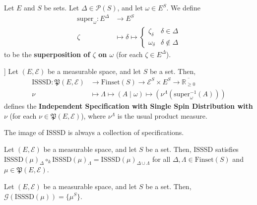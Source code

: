
\begin{definition}[Superposition]
    \label{def:superposition}
    \leanok
    Let $E$ and $S$ be sets. Let $\Delta\in\mathcal{P}(S)$, and let $\omega\in E^S$. We define
    \begin{align*}
        \text{super}_\omega:E^\Delta&\to E^S\\
        \zeta&\mapsto \delta\mapsto\begin{cases}
            \zeta_\delta & \delta\in\Delta\\
            \omega_\delta & \delta\notin\Delta
        \end{cases}
    \end{align*}
    to be the \textbf{superposition of $\zeta$ on $\omega$} (for each $\zeta\in E^\Delta$).
\end{definition}

\begin{definition}[Independent Specification with Single Spin Distribution [ISSSD]]
    \label{def:ISSSD}
    Let $(E,\mathcal{E})$ be a measurable space, and let $S$ be a set. Then,
    \begin{align*}
        \text{ISSSD}:\mathfrak{P}(E,\mathcal{E})&\to\text{Finset}(S)\to\mathcal{E}^S\times E^S\to\overline{\mathbb{R}_{\geq0}}\\
        \nu&\mapsto\Lambda\mapsto(A\mid\omega)\mapsto\left(\nu^\Lambda\left(\text{super}_\omega^{-1}(A)\right)\right)
    \end{align*}
    defines the \textbf{Independent Specification with Single Spin Distribution with $\nu$} (for each $\nu\in\mathfrak{P}(E,\mathcal{E})$), where $\nu^\Lambda$ is the usual product measure.
\end{definition}

\begin{lemma}
    \label{lem:isssd-specification}
    The image of $\text{ISSSD}$ is always a collection of specifications.
\end{lemma}

\begin{lemma}
    \label{lem:isssd-strong-consistency}
    Let $(E,\mathcal{E})$ be a measurable space, and let $S$ be a set. Then, $\text{ISSSD}$ satisfies $\text{ISSSD}(\mu)_\Delta\circ_k\text{ISSSD}(\mu)_\Lambda=\text{ISSSD}(\mu)_{\Delta\cup\Lambda}$ for all $\Delta,\Lambda\in\text{Finset}(S)$ and $\mu\in\mathfrak{P}(E,\mathcal{E})$.
\end{lemma}

\begin{lemma}
    \label{lem:gibbs-measure-existence}
    Let $(E,\mathcal{E})$ be a measurable space, and let $S$ be a set. Then, $\mathcal{G}(\text{ISSSD}(\mu))=\{\mu^S\}$.
\end{lemma}
